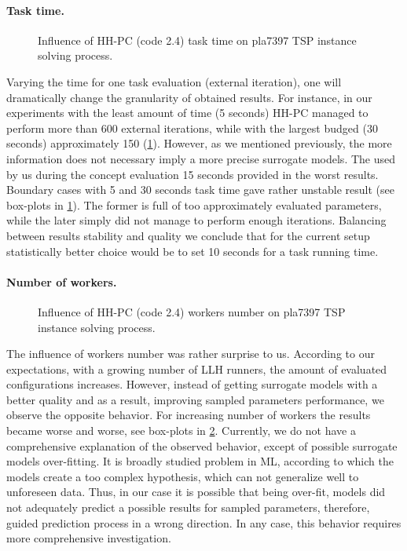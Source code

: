 \paragraph{Task time.}
\begin{figure}[h]
	\centering
	\vspace{-20pt}
	
	\caption{Influence of HH-PC (code 2.4) task time on pla7397 TSP instance solving process.}
	\vspace{-5pt}
	\label{eval:2:pict:task time}
\end{figure}
Varying the time for one task evaluation (external iteration), one will dramatically change the granularity of obtained results. For instance, in our experiments with the least amount of time (5 seconds) HH-PC managed to perform more than 600 external iterations, while with the largest budged (30 seconds) approximately 150 (\cref{eval:2:pict:task time}). However, as we mentioned previously, the more information does not necessary imply a more precise surrogate models. The used by us during the concept evaluation 15 seconds provided in the worst results. Boundary cases with 5 and 30 seconds task time gave rather unstable result (see box-plots in \cref{eval:2:pict:task time}). The former is full of too approximately evaluated parameters, while the later simply did not manage to perform enough iterations. Balancing between results stability and quality we conclude that for the current setup statistically better choice would be to set 10 seconds for a task running time. 

\paragraph{Number of workers.}
\begin{figure}[h]
	\centering
	\vspace{-20pt}
	
	\caption{Influence of HH-PC (code 2.4) workers number on pla7397 TSP instance solving process.}
	\vspace{-5pt}
	\label{eval:2:pict:number of workers}
\end{figure}
The influence of workers number was rather surprise to us. According to our expectations, with a growing number of LLH runners, the amount of evaluated configurations increases. However, instead of getting surrogate models with a better quality and as a result, improving sampled parameters performance, we observe the opposite behavior. For increasing number of workers the results became worse and worse, see box-plots in \cref{eval:2:pict:number of workers}. Currently, we do not have a comprehensive explanation of the observed behavior, except of possible surrogate models over-fitting. It is broadly studied problem in ML, according to which the models create a too complex hypothesis, which can not generalize well to unforeseen data. Thus, in our case it is possible that being over-fit, models did not adequately predict a possible results for sampled parameters, therefore, guided prediction process in a wrong direction. In any case, this behavior requires more comprehensive investigation.

